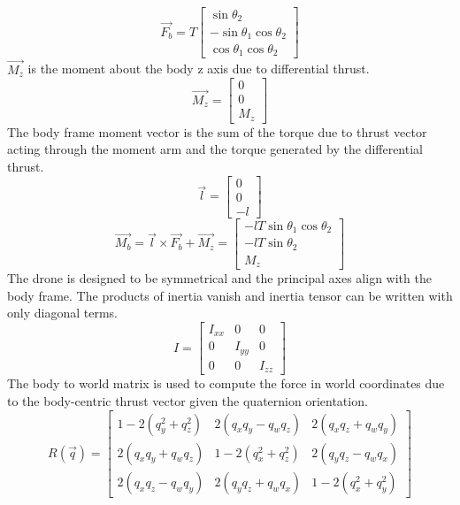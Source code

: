 \documentclass[]{article}
\begin{document}
\begin{enumerate}
	 \[
         \vec{F_b} = T
        \begin{bmatrix}
        \sin{\theta_2}  \\
         -\sin{\theta_1}\cos{\theta_2}  \\
         \cos{\theta_1}\cos{\theta_2}
        \end{bmatrix}
        \]
$\vec{M_z}$ is the moment about the body z axis due to differential thrust.
        \[
	\vec{M_z} =
        \begin{bmatrix}
        0  \\
        0  \\
        M_z
        \end{bmatrix}
        \]
The body frame moment vector is the sum of the torque due to thrust vector acting through the moment arm and the torque generated by the differential thrust.
        \[
	\vec{l} =
        \begin{bmatrix}
        0  \\
        0  \\
        -l
        \end{bmatrix}
        \]
        	 \[
        \vec{M_b} = \vec{l} \times \vec{F_b} + \vec{M_z}=       
        \begin{bmatrix}
        -lT\sin{\theta_1}\cos{\theta_2}  \\
        -lT\sin{\theta_2}  \\
	M_z
        \end{bmatrix}
        \]
The drone is designed to be symmetrical and the principal axes align with the body frame. The products of inertia vanish and inertia tensor can be written with only diagonal terms.
         \[
        I =
        \begin{bmatrix}
        I_{xx} & 0 &0 \\
        0 & I_{yy }& 0 \\
        0 & 0 & I_{zz}
        \end{bmatrix}
        \]
The body to world matrix is used to compute the force in world coordinates due to the body-centric thrust vector given the quaternion orientation.
        \[
        R(\vec{q}) =
        \begin{bmatrix}
        1 - 2(q_y^2 + q_z^2) & 2(q_x q_y - q_w q_z) & 2(q_x q_z + q_w q_y) \\
        2(q_x q_y + q_w q_z) & 1 - 2(q_x^2 + q_z^2) & 2(q_y q_z - q_w q_x) \\
        2(q_x q_z - q_w q_y) & 2(q_y q_z + q_w q_x) & 1 - 2(q_x^2 + q_y^2)
        \end{bmatrix}
\]
\end{enumerate}
\end{document}
